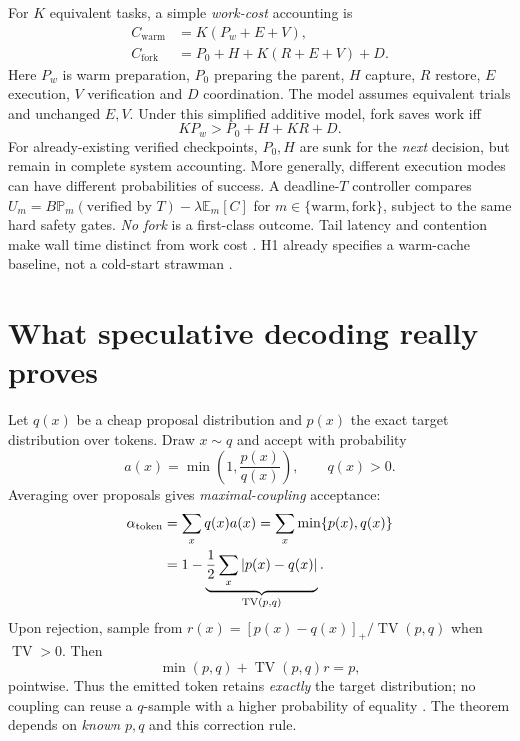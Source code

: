 \documentclass[10pt,twocolumn]{article}
\newcommand{\1}{\mathbf{1}}
\newcommand{\TV}{\operatorname{TV}}
\newcommand{\Prb}{\mathbb{P}}
\newcommand{\E}{\mathbb{E}}
\begin{document}
For $K$ equivalent tasks, a simple \emph{work-cost} accounting is
\begin{equation}
\label{eq:cost}
\begin{aligned}
C_{\mathrm{warm}}&=K(P_w+E+V),\\
C_{\mathrm{fork}}&=P_0+H+K(R+E+V)+D.
\end{aligned}
\end{equation}
Here $P_w$ is warm preparation, $P_0$ preparing the parent, $H$ capture, $R$ restore, $E$ execution, $V$ verification and $D$ coordination. The model assumes equivalent trials and unchanged $E,V$. Under this simplified additive model, fork saves work iff
\begin{equation}
\boxed{K P_w>P_0+H+KR+D.}
\end{equation}
For already-existing verified checkpoints, $P_0,H$ are sunk for the \emph{next} decision, but remain in complete system accounting. More generally, different execution modes can have different probabilities of success. A deadline-$T$ controller compares $U_m=B\Prb_m(\text{verified by }T)-\lambda\E_m[C]$ for $m\in\{\text{warm},\text{fork}\}$, subject to the same hard safety gates. \emph{No fork} is a first-class outcome. Tail latency and contention make wall time distinct from work cost \cite{tail}. H1 already specifies a warm-cache baseline, not a cold-start strawman \cite{cam}.

\section{What speculative decoding really proves}

Let $q(x)$ be a cheap proposal distribution and $p(x)$ the exact target distribution over tokens. Draw $x\sim q$ and accept with probability
\begin{equation}
 a(x)=\min\!\left(1,\frac{p(x)}{q(x)}\right), \qquad q(x)>0.
\end{equation}
Averaging over proposals gives \emph{maximal-coupling} acceptance:
\begin{equation}
\label{eq:tv}
\begin{aligned}
\alpha_{\rm token}
 &=\sum_x q(x)a(x)=\sum_x\min\{p(x),q(x)\}\\
 &=1-\underbrace{\frac12\sum_x|p(x)-q(x)|}_{\TV(p,q)}.
\end{aligned}
\end{equation}
Upon rejection, sample from $r(x)=[p(x)-q(x)]_+/\TV(p,q)$ when $\TV>0$. Then
\begin{equation}
\min(p,q)+\TV(p,q)r=p,
\end{equation}
pointwise. Thus the emitted token retains \emph{exactly} the target distribution; no coupling can reuse a $q$-sample with a higher probability of equality \cite{leviathan}. The theorem depends on \emph{known} $p,q$ and this correction rule.
\end{document}
